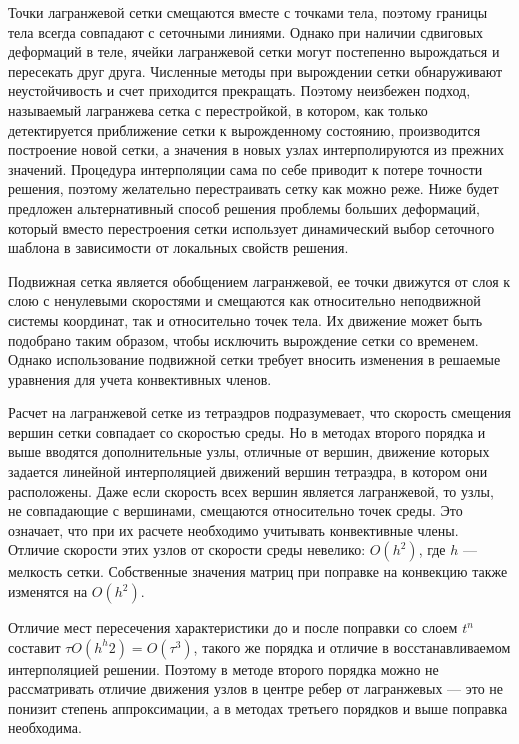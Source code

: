 Точки лагранжевой сетки смещаются вместе с точками тела, поэтому границы тела всегда совпадают с сеточными линиями. Однако при наличии сдвиговых деформаций в теле, ячейки лагранжевой сетки могут постепенно вырождаться и пересекать друг друга. Численные методы при вырождении сетки обнаруживают неустойчивость и счет приходится прекращать. Поэтому неизбежен подход, называемый лагранжева сетка с перестройкой, в котором, как только детектируется приближение сетки к вырожденному состоянию, производится построение новой сетки, а значения в новых узлах интерполируются из прежних значений. Процедура интерполяции сама по себе приводит к потере точности решения, поэтому желательно перестраивать сетку как можно реже. Ниже будет предложен альтернативный способ решения проблемы больших деформаций, который вместо перестроения сетки использует динамический выбор сеточного шаблона в зависимости от локальных свойств решения.

Подвижная сетка является обобщением лагранжевой, ее точки движутся от слоя к слою с ненулевыми скоростями и смещаются как относительно неподвижной системы координат, так и относительно точек тела. Их движение может быть подобрано таким образом, чтобы исключить вырождение сетки со временем. Однако использование подвижной сетки требует вносить изменения в решаемые уравнения для учета конвективных членов.

Расчет на лагранжевой сетке из тетраэдров подразумевает, что скорость смещения вершин сетки совпадает со скоростью среды. Но в методах второго порядка и выше вводятся дополнительные узлы, отличные от вершин, движение которых задается линейной интерполяцией движений вершин тетраэдра, в котором они расположены. Даже если скорость всех вершин является лагранжевой, то узлы, не совпадающие с вершинами, смещаются относительно точек среды. Это означает, что при их расчете необходимо учитывать конвективные члены. Отличие скорости этих узлов от скорости среды невелико: $O(h^2)$, где $h$ — мелкость сетки. Собственные значения матриц при поправке на конвекцию также изменятся на $O(h^2)$.

Отличие мест пересечения характеристики до и после поправки со слоем $t^n$ составит $\tau O(h^h2) = O(\tau^3)$, такого же порядка и отличие в восстанавливаемом интерполяцией решении. Поэтому в методе второго порядка можно не рассматривать отличие движения узлов в центре ребер от лагранжевых — это не понизит степень аппроксимации, а в методах третьего порядков и выше поправка необходима.

\clearpage
\newpage

